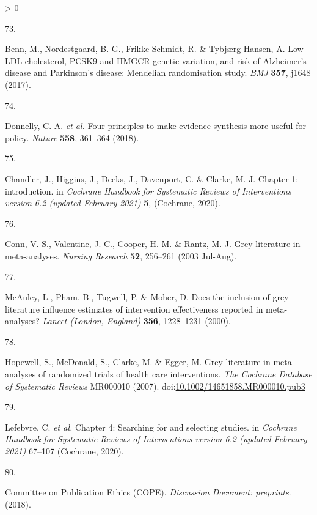 \documentclass[a4paper, twoside]{templates/ociamthesis}
\newlength{\cslhangindent}
\newlength{\csllabelwidth}
\newenvironment{CSLReferences}[3] %
 {%
  \setlength{\parindent}{0pt}
  \ifodd #1 \everypar{\setlength{\hangindent}{\cslhangindent}}\ignorespaces\fi
  \ifnum #2 > 0
  \setlength{\parskip}{#2\baselineskip}
  \fi
 }%
 {}
\newcommand{\CSLLeftMargin}[1]{\parbox[t]{\maxof{\widthof{#1}}{\csllabelwidth}}{#1}}
\newcommand{\CSLRightInline}[1]{\parbox[t]{\linewidth - \csllabelwidth}{#1}}
\begin{document}
\begin{CSLReferences}{0}{0}
\leavevmode\hypertarget{ref-benn2017}{}%
\CSLLeftMargin{73. }
\CSLRightInline{Benn, M., Nordestgaard, B. G., Frikke-Schmidt, R. \& Tybjærg-Hansen, A. Low {LDL} cholesterol, {PCSK9} and {HMGCR} genetic variation, and risk of {Alzheimer}'s disease and {Parkinson}'s disease: Mendelian randomisation study. \emph{BMJ} \textbf{357}, j1648 (2017).}

\leavevmode\hypertarget{ref-donnelly2018}{}%
\CSLLeftMargin{74. }
\CSLRightInline{Donnelly, C. A. \emph{et al.} Four principles to make evidence synthesis more useful for policy. \emph{Nature} \textbf{558}, 361--364 (2018).}

\leavevmode\hypertarget{ref-chandler2019chapter}{}%
\CSLLeftMargin{75. }
\CSLRightInline{Chandler, J., Higgins, J., Deeks, J., Davenport, C. \& Clarke, M. J. Chapter 1: introduction. in \emph{Cochrane {Handbook} for {Systematic Reviews} of {Interventions} version 6.2 (updated {February} 2021)} \textbf{5}, ({Cochrane}, 2020).}

\leavevmode\hypertarget{ref-conn2003}{}%
\CSLLeftMargin{76. }
\CSLRightInline{Conn, V. S., Valentine, J. C., Cooper, H. M. \& Rantz, M. J. Grey literature in meta-analyses. \emph{Nursing Research} \textbf{52}, 256--261 (2003 Jul-Aug).}

\leavevmode\hypertarget{ref-mcauley2000}{}%
\CSLLeftMargin{77. }
\CSLRightInline{McAuley, L., Pham, B., Tugwell, P. \& Moher, D. Does the inclusion of grey literature influence estimates of intervention effectiveness reported in meta-analyses? \emph{Lancet (London, England)} \textbf{356}, 1228--1231 (2000).}

\leavevmode\hypertarget{ref-hopewell2007}{}%
\CSLLeftMargin{78. }
\CSLRightInline{Hopewell, S., McDonald, S., Clarke, M. \& Egger, M. Grey literature in meta-analyses of randomized trials of health care interventions. \emph{The Cochrane Database of Systematic Reviews} MR000010 (2007). doi:\href{https://doi.org/10.1002/14651858.MR000010.pub3}{10.1002/14651858.MR000010.pub3}}

\leavevmode\hypertarget{ref-lefebvre2019searching}{}%
\CSLLeftMargin{79. }
\CSLRightInline{Lefebvre, C. \emph{et al.} Chapter 4: Searching for and selecting studies. in \emph{Cochrane {Handbook} for {Systematic Reviews} of {Interventions} version 6.2 (updated {February} 2021)} 67--107 ({Cochrane}, 2020).}

\leavevmode\hypertarget{ref-committeeonpublicationethicscope2018}{}%
\CSLLeftMargin{80. }
\CSLRightInline{Committee on Publication Ethics (COPE). \emph{Discussion {Document}: preprints}. (2018).}


\end{CSLReferences}
\end{document}
